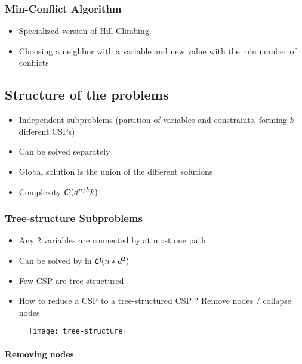 \subsubsection{Min-Conflict Algorithm}
\begin{itemize}
\item Specialized version of Hill Climbing
\item Choosing a neighbor with a variable and new value with the min number of conflicts
\end{itemize}

\subsection{Structure of the problems}

\begin{itemize}
\item Independent subproblems (partition of variables and constraints, forming $k$ different CSPs)
\item Can be solved separately
\item Global solution is the union of the different solutions
\item Complexity $\bigO (d^{n/k} k)$
\end{itemize}

\subsubsection{Tree-structure Subproblems}

\begin{itemize}
\item Any $2$ variables are connected by at most one path.
\item Can be solved by in $\bigO (n*d^2)$
\item Few CSP are tree structured
\item How to reduce a CSP to a tree-structured CSP ? Remove nodes / collapse nodes
\end{itemize}

\begin{figure}[H]
    \centering
    \texttt{[image: tree-structure]}
\end{figure}

\paragraph{Removing nodes}


